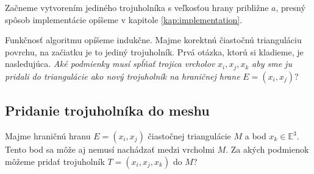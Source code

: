 Začneme vytvorením jediného trojuholníka s veľkosťou hrany približne $a$, presný spôsob implementácie
opíšeme v kapitole \ref{kap:implementation}.

Funkčnosť algoritmu opíšeme indukčne. Majme korektnú čiastočnú trianguláciu povrchu, na začiatku
je to jediný trojuholník. Prvá otázka, ktorú si kladieme, je nasledujúca. 
\textit{Aké podmienky musí spĺňať trojica vrcholov} $x_i, x_j, x_k$ 
\textit{aby sme ju pridali do triangulácie ako nový trojuholník na hraničnej hrane} $E = (x_i, x_j)?$ 

\subsection{Pridanie trojuholníka do meshu}
\label{kap:triangle_conditions}

Majme hraničnú hranu $E=(x_i, x_j)$ čiastočnej triangulácie $M$ a bod $x_k \in \mathbb{E}^3$. 
Tento bod sa môže aj nemusí nachádzať medzi vrcholmi $M$. Za akých podmienok môžeme pridať trojuholník 
$T=(x_i, x_j, x_k)$ do $M$?

